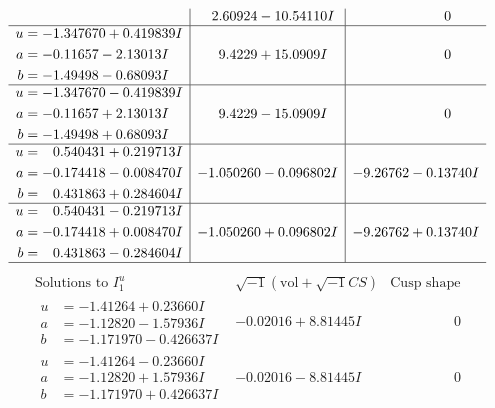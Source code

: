 \documentclass[1p]{elsarticle_modified}
\theoremstyle{definition}
\newcommand{\I}{\sqrt{-1}}
\begin{document}
$$\begin{array}{c|c|c}
 & \phantom{-}2.60924 - 10.54110 I & \phantom{-0.000000 } 0 \\ \hline\begin{aligned}
u &= -1.347670 + 0.419839 I \\
a &= -0.11657 - 2.13013 I \\
b &= -1.49498 - 0.68093 I\end{aligned}
 & \phantom{-}9.4229 + 15.0909 I & \phantom{-0.000000 } 0 \\ \hline\begin{aligned}
u &= -1.347670 - 0.419839 I \\
a &= -0.11657 + 2.13013 I \\
b &= -1.49498 + 0.68093 I\end{aligned}
 & \phantom{-}9.4229 - 15.0909 I & \phantom{-0.000000 } 0 \\ \hline\begin{aligned}
u &= \phantom{-}0.540431 + 0.219713 I \\
a &= -0.174418 - 0.008470 I \\
b &= \phantom{-}0.431863 + 0.284604 I\end{aligned}
 & -1.050260 - 0.096802 I & -9.26762 - 0.13740 I \\ \hline\begin{aligned}
u &= \phantom{-}0.540431 - 0.219713 I \\
a &= -0.174418 + 0.008470 I \\
b &= \phantom{-}0.431863 - 0.284604 I\end{aligned}
 & -1.050260 + 0.096802 I & -9.26762 + 0.13740 I\\
 \hline 
 \end{array}$$\newpage$$\begin{array}{c|c|c}  
\text{Solutions to }I^u_{1}& \I (\text{vol} + \sqrt{-1}CS) & \text{Cusp shape}\\
 \hline 
\begin{aligned}
u &= -1.41264 + 0.23660 I \\
a &= -1.12820 - 1.57936 I \\
b &= -1.171970 - 0.426637 I\end{aligned}
 & -0.02016 + 8.81445 I & \phantom{-0.000000 } 0 \\ \hline\begin{aligned}
u &= -1.41264 - 0.23660 I \\
a &= -1.12820 + 1.57936 I \\
b &= -1.171970 + 0.426637 I\end{aligned}
 & -0.02016 - 8.81445 I & \phantom{-0.000000 } 0 \\ \hline\begin{aligned}

\end{aligned}
\end{array}$$
\end{document}
